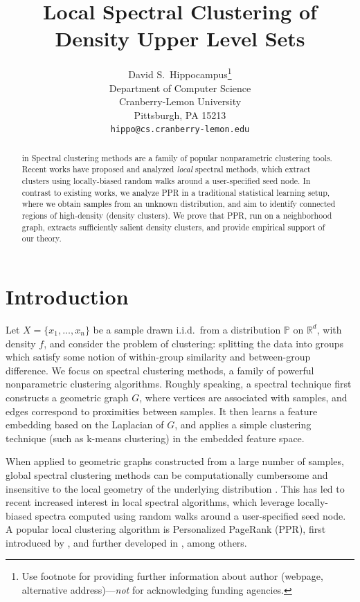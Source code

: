 \documentclass{article}
\title{Local Spectral Clustering of Density Upper Level Sets}
\author{%
  David S.~Hippocampus\thanks{Use footnote for providing further information
    about author (webpage, alternative address)---\emph{not} for acknowledging
    funding agencies.} \\
  Department of Computer Science\\
  Cranberry-Lemon University\\
  Pittsburgh, PA 15213 \\
  \texttt{hippo@cs.cranberry-lemon.edu} \\
}
\newcommand{\Reals}{\mathbb{R}}
\newcommand{\Rd}{\Reals^d}
\newcommand{\1}{\mathbf{1}}
\newcommand{\Xbf}{X}             %
\newcommand{\Pbb}{\mathbb{P}}
\newcommand{\ppr}{{\sc PPR}}
\theoremstyle{aldenthm}
\theoremstyle{aldenrmrk}
\begin{document}
\maketitle

\begin{abstract}
 in
  Spectral clustering methods are a family of popular nonparametric clustering
  tools.  Recent works have proposed and analyzed \emph{local} spectral methods,
  which extract clusters using locally-biased random walks around a user-specified
  seed node.  In contrast to existing works, we analyze PPR in a traditional
  statistical learning setup, where we obtain samples from an unknown
  distribution, and aim to identify connected regions of high-density (density
  clusters).  We prove that PPR, run on a neighborhood graph, extracts
  sufficiently salient density clusters, and provide empirical support of our theory.
\end{abstract}

\section{Introduction}
\label{sec: introduction}

Let $\Xbf = \{x_1, \ldots, x_n\}$ be a sample drawn i.i.d.\ from a
distribution $\Pbb$ on $\Rd$, with density $f$, and consider the problem of 
clustering: splitting the data into groups which satisfy some notion of
within-group similarity and between-group difference.  We focus on spectral
clustering methods, a family of powerful nonparametric clustering algorithms.
Roughly speaking, a spectral technique first constructs a geometric graph $G$,
where vertices are associated with samples, and edges correspond to proximities
between samples. It then learns a feature embedding based on the Laplacian of
$G$, and applies a simple clustering technique (such as k-means clustering) in
the embedded feature space.

When applied to geometric graphs constructed from a large number of samples,
global spectral clustering methods can be computationally cumbersome and   
insensitive to the local geometry of the underlying distribution
\citep{leskovec2010,mahoney2012}.  This has led to recent increased interest in
local spectral algorithms, which leverage locally-biased spectra computed using
random walks around a user-specified seed node.  A popular local clustering
algorithm is Personalized PageRank (\ppr), first introduced by
\citet{haveliwala2003}, and further developed in
\citep{spielman2011,spielman2014,andersen2006,mahoney2012,zhu2013},
among others.  
\end{document}
